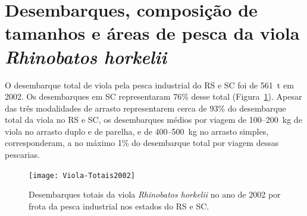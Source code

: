 \documentclass[a4paper,11pt,twoside,showtrims,onecolumn,openright,final]{memoir}
\begin{document}











\section*{Desembarques, composição de tamanhos e áreas de pesca da viola \emph{Rhinobatos horkelii}}

O desembarque total de viola pela pesca industrial do RS e SC foi de 561~t em 2002. Os desembarques 
em SC representaram 76\% desse total (Figura~\ref{fig:desemb-viola}). 
Apesar das três modalidades de arrasto representarem
cerca de 93\% do desembarque total da viola no RS e SC, os desembarques médios por viagem 
de 100--200~kg de viola no arrasto duplo e de parelha, e de 400--500~kg no arrasto simples,
corresponderam, a no máximo 1\% do desembarque total por viagem dessas pescarias.

%
%

\begin{figure}
\begin{center}
\texttt{[image: Viola-Totais2002]}
\end{center}
\caption[Desembarques totais da viola no ano de 2002 por frota da pesca industrial.]
        {Desembarques totais da viola \emph{Rhinobatos horkelii} 
         no ano de 2002 por frota da pesca industrial nos estados do RS e SC.}
\label{fig:desemb-viola}
\end{figure}
\end{document}

